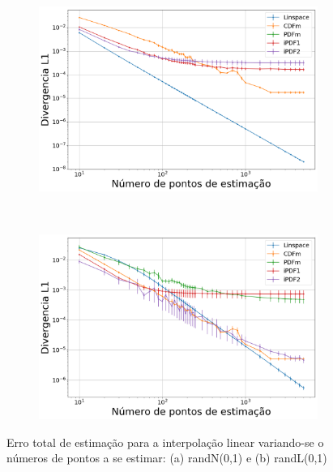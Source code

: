 \begin{figure}[H]
	\centering
	\begin{subfigure}[b]{0.45\textwidth}
		\centering 
		\includegraphics[width=\textwidth]{./figuras/ERRORPLOT_L1_FALSE_NORMAL_LINEAR_10000}
		\caption{}
		\label{fig:errornormlin_data}
	\end{subfigure}
	\hfill
	~ %
	\begin{subfigure}[b]{0.45\textwidth}
		\centering 
		\includegraphics[width=\textwidth]{./figuras/ERRORPLOT_L1_FALSE_LOGNORMAL_LINEAR_10000}
		\caption{}
		\label{fig:errorloglin_data}
	\end{subfigure}
	
	\caption{Erro total de estimação para a interpolação linear variando-se o números de pontos a se estimar: (a) randN(0,1) e (b) randL(0,1)}
	\label{fig:errorplotlin_data}
\end{figure}

